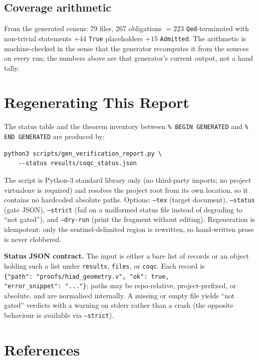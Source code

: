 \documentclass[11pt]{article}
\theoremstyle{definition}
\begin{document}
\subsection{Coverage arithmetic}

From the generated census: 79 files, 267 obligations
$= 223$ \texttt{Qed}-terminated with non-trivial statements
$+ 44$ \texttt{True} placeholders $+ 15$ \texttt{Admitted}. The arithmetic
is machine-checked in the sense that the generator recomputes it from the
sources on every run; the numbers above are that generator's current
output, not a hand tally.

\section{Regenerating This Report}\label{sec:regen}

The status table and the theorem inventory between
\texttt{\% BEGIN GENERATED} and \texttt{\% END GENERATED} are produced by:

\begin{verbatim}
python3 scripts/gen_verification_report.py \
    --status results/coqc_status.json
\end{verbatim}

\noindent The script is Python-3 standard library only (no third-party
imports; no project virtualenv is required) and resolves the project root
from its own location, so it contains no hardcoded absolute paths. Options:
\texttt{--tex} (target document), \texttt{--status} (gate JSON),
\texttt{--strict} (fail on a malformed status file instead of degrading to
``not gated''), and \texttt{--dry-run} (print the fragment without
editing). Regeneration is idempotent: only the sentinel-delimited region
is rewritten, so hand-written prose is never clobbered.

\textbf{Status JSON contract.} The input is either a bare list of records
or an object holding such a list under \texttt{results}, \texttt{files},
or \texttt{coqc}. Each record is
\texttt{\{"path":\ "proofs/hiad\_geometry.v",\ "ok":\ true,\\
"error\_snippet":\ "..."\}}; paths may be repo-relative, project-prefixed,
or absolute, and are normalised internally. A missing or empty file yields
``not gated'' verdicts with a warning on stderr rather than a crash (the
opposite behaviour is available via \texttt{--strict}).

\section*{References}
\end{document}
